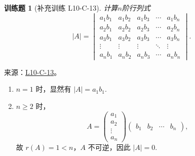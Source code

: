 \documentclass[UTF8,12pt,a4paper,fontset=fandol]{ctexart}
\newtheorem{exercise}{训练题}[section]
\begin{document}
\begin{exercise}[补充训练 L10-C-13]\label{prob:L10-C-13}
计算$n$阶行列式
        \[|A|=\begin{vmatrix}
                a_1b_1 & a_1b_2 & a_1b_3 & \cdots & a_1b_n \\
                a_2b_1 & a_2b_2 & a_2b_3 & \cdots & a_2b_n \\
                a_3b_1 & a_3b_2 & a_3b_3 & \cdots & a_3b_n \\
                \vdots & \vdots & \vdots & \ddots & \vdots \\
                a_nb_1 & a_nb_2 & a_nb_3 & \cdots & a_nb_n
            \end{vmatrix}.\]
\end{exercise}
\noindent 来源：\href{https://github.com/yhwu-is/Linear-Algebra-Left-Undone/blob/new/%E8%AE%B2%E4%B9%89/%E4%B8%93%E9%A2%98/10%20%E8%A1%8C%E5%88%97%E5%BC%8F.tex}{L10-C-13}。
\begin{solve}
\begin{enumerate}
                \item $n=1$ 时，显然有 $|A|=a_1b_1$.

                \item $n \geqslant 2$ 时，
                    \[
                        A = \begin{pmatrix}
                            a_1 \\ a_2 \\ \vdots \\ a_n
                        \end{pmatrix} \begin{pmatrix}
                            b_1 & b_2 & \cdots & b_n
                        \end{pmatrix},
                    \]
                    故 $r(A) = 1 < n$，$A$ 不可逆，因此 $|A| = 0$.
            \end{enumerate}
\end{solve}
\end{document}
